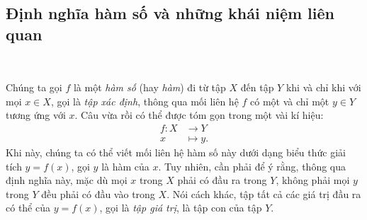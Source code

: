 \subsection{Định nghĩa hàm số và những khái niệm liên quan}

\ %

Chúng ta gọi $f$ là một \emph{hàm số} (hay \emph{hàm}) đi từ tập $X$ đến tập $Y$ khi và chỉ khi với mọi $x\in X$, gọi là \emph{tập xác định}, thông qua mối liên hệ $f$ có một và chỉ một $y\in Y$ tương ứng với $x$. Câu vừa rồi có thể được tóm gọn trong một vài kí hiệu: \begin{align*}f: X &\to Y \\ x &\mapsto y.\end{align*} Khi này, chúng ta có thể viết mối liên hệ hàm số này dưới dạng biểu thức giải tích $y=f(x)$, gọi $y$ là hàm của $x$. Tuy nhiên, cần phải để ý rằng, thông qua định nghĩa này, mặc dù mọi $x$ trong $X$ phải có đầu ra trong $Y$, không phải mọi $y$ trong $Y$ đều phải có đầu vào trong $X$. Nói cách khác, tập tất cả các giá trị đầu ra có thể của $y=f(x)$, gọi là \emph{tập giá trị}, là tập con của tập $Y$.

